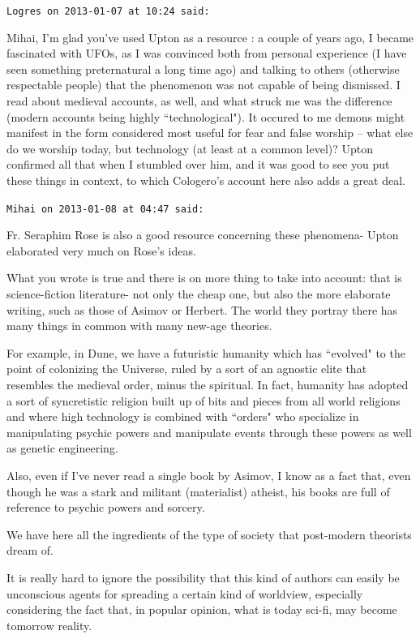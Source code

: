 \begin{footnotesize}
\begin{sffamily}
\hfill

\texttt{Logres on 2013-01-07 at 10:24 said: }

Mihai, I'm glad you've used Upton as a resource : a couple of years ago, I became fascinated with UFOs, as I was convinced both from personal experience (I have seen something preternatural a long time ago) and talking to others (otherwise respectable people) that the phenomenon was not capable of being dismissed. I read about medieval accounts, as well, and what struck me was the difference (modern accounts being highly ``technological"). It occured to me demons might manifest in the form considered most useful for fear and false worship – what else do we worship today, but technology (at least at a common level)? Upton confirmed all that when I stumbled over him, and it was good to see you put these things in context, to which Cologero's account here also adds a great deal.


\hfill

\texttt{Mihai on 2013-01-08 at 04:47 said: }

Fr. Seraphim Rose is also a good resource concerning these phenomena- Upton elaborated very much on Rose's ideas. 

What you wrote is true and there is on more thing to take into account: that is science-fiction literature- not only the cheap one, but also the more elaborate writing, such as those of Asimov or Herbert. The world they portray there has many things in common with many new-age theories. 

For example, in Dune, we have a futuristic humanity which has ``evolved" to the point of colonizing the Universe, ruled by a sort of an agnostic elite that resembles the medieval order, minus the spiritual. In fact, humanity has adopted a sort of syncretistic religion built up of bits and pieces from all world religions and where high technology is combined with ``orders" who specialize in manipulating psychic powers and manipulate events through these powers as well as genetic engineering. 

Also, even if I've never read a single book by Asimov, I know as a fact that, even though he was a stark and militant (materialist) atheist, his books are full of reference to psychic powers and sorcery.

We have here all the ingredients of the type of society that post-modern theorists dream of.

It is really hard to ignore the possibility that this kind of authors can easily be unconscious agents for spreading a certain kind of worldview, especially considering the fact that, in popular opinion, what is today sci-fi, may become tomorrow reality.



\end{sffamily}
\end{footnotesize}
